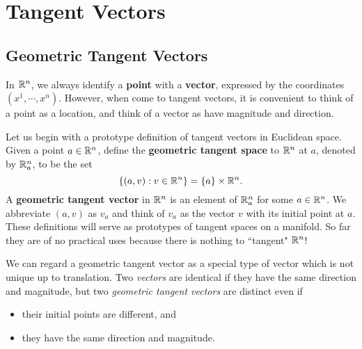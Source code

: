 \section{Tangent Vectors}
\subsection{Geometric Tangent Vectors}
In $\mathbb{R}^n$, we always identify a \textbf{point} with a \textbf{vector}, expressed by the coordinates $(x^1,\cdots,x^n)$. However, when come to tangent vectors, it is convenient to think of a point as a location, and think of a vector as have magnitude and direction. 

Let us begin with a prototype definition of tangent vectors in Euclidean space. 
Given a point $a \in \mathbb{R}^n$, define the \textbf{geometric tangent space} to $\mathbb{R}^n$ at $a$, denoted by $\mathbb{R}_a^n$, to be the set 
$$\{(a,v): v \in \mathbb{R}^n\} = \{a\} \times \mathbb{R}^n. $$
A \textbf{geometric tangent vector} in $\mathbb{R}^n$ is an element of $\mathbb{R}_a^n$ for some $a \in \mathbb{R}^n$. We abbreviate $(a,v)$ as $v_a$ and think of $v_a$ as the vector $v$ with its initial point at $a$. These definitions will serve as prototypes of tangent spaces on a manifold. So far they are of no practical uses because there is nothing to ``tangent" $\mathbb{R}^n$! \\
\begin{remark}
    We can regard a geometric tangent vector as a special type of vector which is not unique up to translation. Two \textit{vectors} are identical if they have the same direction and magnitude, but two \textit{geometric tangent vectors} are distinct even if 
    \begin{itemize}
    \item their initial points are different, and
    \item they have the same direction and magnitude.
    \end{itemize}
\end{remark}


